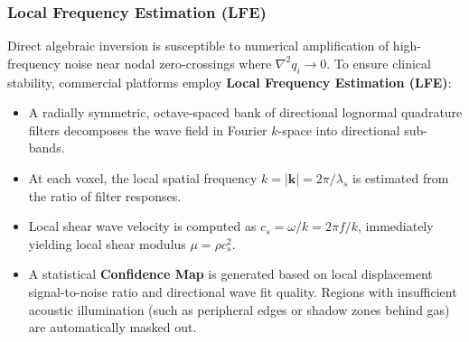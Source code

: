 \documentclass[11pt,a4paper]{article}
\begin{document}
\subsubsection{Local Frequency Estimation (LFE)}
Direct algebraic inversion is susceptible to numerical amplification of high-frequency noise near nodal zero-crossings where $\nabla^2 q_i \to 0$. To ensure clinical stability, commercial platforms employ \textbf{Local Frequency Estimation (LFE)}:
\begin{itemize}[leftmargin=2em]
    \item A radially symmetric, octave-spaced bank of directional lognormal quadrature filters decomposes the wave field in Fourier $k$-space into directional sub-bands.
    \item At each voxel, the local spatial frequency $k = |\mathbf{k}| = 2\pi / \lambda_s$ is estimated from the ratio of filter responses.
    \item Local shear wave velocity is computed as $c_s = \omega / k = 2\pi f / k$, immediately yielding local shear modulus $\mu = \rho c_s^2$.
    \item A statistical \textbf{Confidence Map} is generated based on local displacement signal-to-noise ratio and directional wave fit quality. Regions with insufficient acoustic illumination (such as peripheral edges or shadow zones behind gas) are automatically masked out.
\end{itemize}
\end{document}

